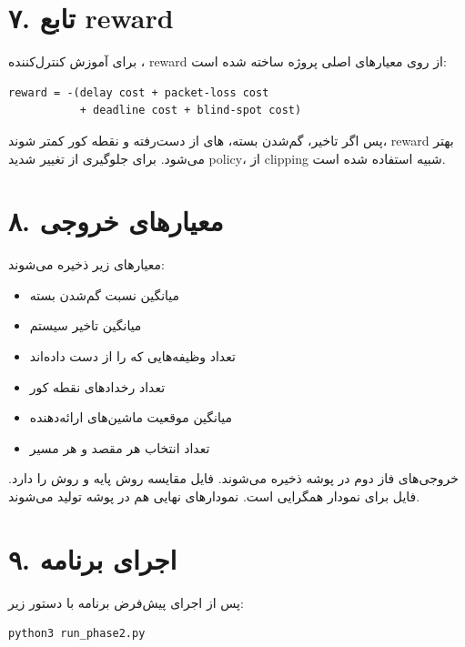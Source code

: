 \documentclass[12pt]{exam}
\begin{document}
\begin{questions}
\section*{۷. تابع reward}
برای آموزش کنترل‌کننده ، reward از روی معیارهای اصلی پروژه ساخته شده است:

\begin{latin}
\begin{lstlisting}
reward = -(delay cost + packet-loss cost
           + deadline cost + blind-spot cost)
\end{lstlisting}
\end{latin}

پس اگر تاخیر، گم‌شدن بسته، های از دست‌رفته و نقطه کور کمتر شوند،
reward بهتر می‌شود. برای جلوگیری از تغییر شدید policy، از clipping شبیه 
استفاده شده است.

\section*{۸. معیارهای خروجی}
معیارهای زیر ذخیره می‌شوند:

\begin{itemize}
\item میانگین نسبت گم‌شدن بسته
\item میانگین تاخیر سیستم
\item تعداد وظیفه‌هایی که  را از دست داده‌اند
\item تعداد رخدادهای نقطه کور
\item میانگین موقعیت ماشین‌های ارائه‌دهنده
\item تعداد انتخاب هر مقصد و هر مسیر
\end{itemize}

خروجی‌های فاز دوم در پوشه  ذخیره می‌شوند. فایل
 مقایسه روش پایه و روش  را دارد.
فایل  برای نمودار همگرایی  است. نمودارهای نهایی
هم در پوشه  تولید می‌شوند.

\section*{۹. اجرای برنامه}
پس از اجرای پیش‌فرض برنامه با دستور زیر:

\begin{latin}
\begin{lstlisting}
python3 run_phase2.py
\end{lstlisting}
\end{latin}


\end{questions}
\end{document}
